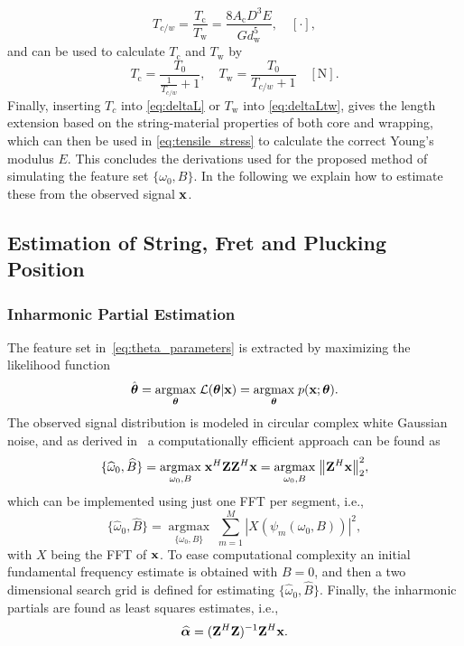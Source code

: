 \documentclass{article}
\begin{document}
\begin{sloppy}
\begin{equation}
    T_{c/w} = \frac{T_\text{c}}{T_\text{w}} = \frac{8A_\text{c}D^3E}{Gd_\text{w}^5},  \quad [\cdot],
\end{equation}
%
and can be used to calculate $T_\text{c}$ and $T_\text{w}$ by
%
\begin{equation}\label{eq:Tc_derived}
    T_\text{c} = \frac{T_0}{\frac{1}{T_{c/w}}+1}, \quad T_\text{w} = \frac{T_0}{T_{c/w}+1}\quad [\text{N}].
\end{equation}
%
Finally, inserting $T_c$ into \eqref{eq:deltaL} or $T_\text{w}$ into \eqref{eq:deltaLtw}, gives the length extension based on the string-material properties of both core and wrapping, which can then be used in \eqref{eq:tensile_stress} to calculate the correct Young's modulus $E$. This concludes the derivations used for the proposed method of simulating the feature set $\{\omega_0, B\}$. In the following we explain how to estimate these from the observed signal $\mathbf x$.

\subsection{Estimation of String, Fret and Plucking Position}
\subsubsection{Inharmonic Partial Estimation}
The feature set in~\eqref{eq:theta_parameters} is extracted by maximizing the likelihood function %
\begin{equation}
    \hat{\boldsymbol\theta} = \underset{\text{\boldmath$\theta$}}{\operatorname{argmax}}\;{\mathcal{L}(\text{\boldmath$\theta$} | \mathbf x)} = \underset{\text{\boldmath$\theta$}}{\operatorname{argmax}}\;{p(\mathbf x ; \text{\boldmath$\theta$})}.
\end{equation}
The observed signal distribution is modeled in circular complex white Gaussian noise, and as derived in~\cite{hjerrild::icassp19} a computationally efficient approach can be found as
\begin{equation} \label{eq:ANLS}
    \{\widehat\omega_0, \widehat B \} = \underset{\omega_0,B}{\operatorname{argmax}}\;{\mathbf x^H \mathbf{Z} \mathbf{Z}^H \mathbf x} = \underset{\omega_0,B}{\operatorname{argmax}}\;{ \left\lVert\mathbf{Z}^H\mathbf x\right\rVert_2^2},
\end{equation}
which can be implemented using just one FFT per segment, i.e.,
\begin{equation}
    	\{\widehat\omega_0,\widehat B  \} = \underset{\{\omega_0, B  \}}{\operatorname{argmax}}\; \sum_{m=1}^{M} |X(\psi_m(\omega_0,B))|^2, 
\end{equation}
with $X$ being the FFT of $\mathbf x$. To ease computational complexity an initial fundamental frequency estimate is obtained with $B=0$, and then a two dimensional search grid is defined for estimating  $\{\widehat\omega_0, \widehat B \}$. %
 Finally, the inharmonic partials are found as least squares estimates, i.e.,
\begin{equation}\label{eq:alphahat}
  \text{\boldmath${\widehat\alpha}$} = (\mathbf{Z}^H\mathbf{Z})^{-1}\mathbf{Z}^H\mathbf x.
\end{equation}

\end{sloppy}
\end{document}
